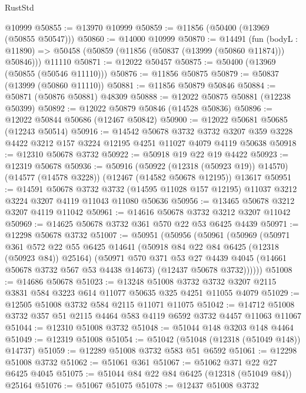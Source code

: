 \begin{lexlean}{RustStd}
\begin{coremodule}
    @10999
@50855 := @13970 @10999
@50859 := @11856 (@50400 (@13969 (@50855 @50547)))
@50860 := @14000 @10999
@50870 := @14491
    (fun (bodyL : @11890) => @50458 (@50859 (@11856 (@50837 (@13999 (@50860 @11874))) @50846)))
    @11110
@50871 := @12022 @50457
@50875 := @50400 (@13969 (@50855 (@50546 @11110)))
@50876 := @11856 @50875
@50879 := @50837 (@13999 (@50860 @11110))
@50881 := @11856 @50879 @50846
@50884 := @50871 (@50876 @50881) @48309
@50888 := @12022 @50875 @50881 (@12238 @50399)
@50892 := @12022 @50879 @50846 (@14528 @50836)
@50896 := @12022 @50844 @50686 (@12467 @50842)
@50900 := @12022 @50681 @50685 (@12243 @50514)
@50916 := @14542
    @50678
    @3732
    @3732
    @3207
    @359
    @3228
    @4422
    @3212
    @157
    @3224
    @12195
    @4251
    @11027
    @4079
    @4119
    @50638
@50918 := @12310 @50678 @3732
@50922 := @50918 @19 @22 @19 @4422
@50923 := @12319 @50678
@50936 := @50916
    (@50922 (@12318 (@50923 @19)) @14570)
    (@14577 (@14578 @3228))
    (@12467 (@14582 @50678 @12195))
    @13617
@50951 := @14591
    @50678
    @3732
    @3732
    (@14595 @11028 @157 @12195)
    @11037
    @3212
    @3224
    @3207
    @4119
    @11043
    @11080
    @50636
@50956 := @13465 @50678 @3212 @3207 @4119 @11042
@50961 := @14616 @50678 @3732 @3212 @3207 @11042
@50969 := @14625 @50678 @3732 @361 @570 @22 @53 @6425 @4439
@50971 := @12298 @50678 @3732
@51007 := @50951
    (@50956
      (@50961
        (@50969
          (@50971
            @361
            @572
            @22
            @55
            @6425
            @14641
            (@50918 @84 @22 @84 @6425 (@12318 (@50923 @84)) @25164)
            (@50971
              @570
              @371
              @53
              @27
              @4439
              @4045
              (@14661 @50678 @3732 @567 @53 @4438 @14673)
              (@12437 @50678 @3732))))))
@51008 := @14686 @50678
@51023 := @13248
    @51008
    @3732
    @3732
    @3207
    @2115
    @3831
    @584
    @3223
    @614
    @11077
    @50635
    @325
    @4251
    @11055
    @4079
@51029 := @12505 @51008 @3732 @584 @2115 @11071 @11075
@51042 := @14712 @51008 @3732 @357 @51 @2115 @4464 @583 @4119 @6592 @3732 @4457 @11063 @11067
@51044 := @12310 @51008 @3732
@51048 := @51044 @148 @3203 @148 @4464
@51049 := @12319 @51008
@51054 := @51042 (@51048 (@12318 (@51049 @148)) @14737)
@51059 := @12289 @51008 @3732 @583 @51 @6592
@51061 := @12298 @51008 @3732
@51062 := @51061 @361
@51067 := @51062 @371 @22 @27 @6425 @4045
@51075 := @51044 @84 @22 @84 @6425 (@12318 (@51049 @84)) @25164
@51076 := @51067 @51075
@51078 := @12437 @51008 @3732

\end{coremodule}
\end{lexlean}
